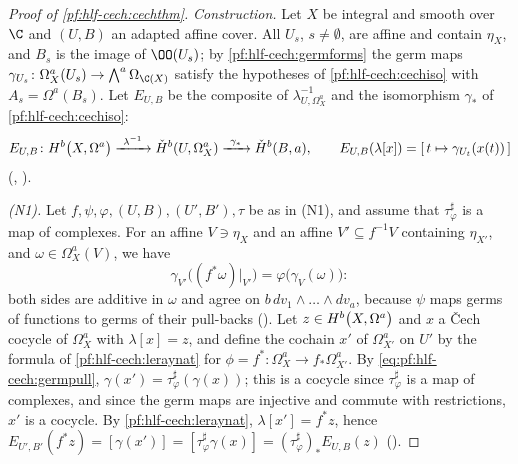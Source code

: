 \begin{proof}[Proof of \cref{pf:hlf-cech:cechthm}]
\emph{Construction.} Let $X$ be integral and smooth over $\C$ and $(U,B)$ an adapted affine cover. All $U_s$, $s\ne\emptyset$, are affine and
contain $\eta_X$, and $B_s$ is the image of $\OO(U_s)$; by \cref{pf:hlf-cech:germforms} the germ maps $\gamma_{U_s}\colon\Omega^a_X(U_s)\to
\bigwedge^a\Omega_{\C(X)}$ satisfy the hypotheses of \cref{pf:hlf-cech:cechiso} with $A_s=\Omega^a(B_s)$. Let $E_{U,B}$ be the composite of
$\lambda_{U,\Omega^a_X}^{-1}$ and the isomorphism $\gamma_*$ of \cref{pf:hlf-cech:cechiso}:
\[
  E_{U,B}\colon\hlfcechHdg{X}{a}{b}\xrightarrow{\ \lambda^{-1}\ }\check H^b(U,\Omega^a_X)\xrightarrow{\ \gamma_*\ }\check H^b(B,a),\qquad
  E_{U,B}(\lambda[x])=[\,t\mapsto\gamma_{U_t}(x(t))\,]
\]
(, ).

\emph{(N1).} Let $f,\psi,\varphi,(U,B),(U',B'),\tau$ be as in (N1), and assume that $\tau^\sharp_\varphi$ is a map of complexes. For an affine
$V\ni\eta_X$ and an affine $V'\subseteq f^{-1}V$ containing $\eta_{X'}$, and $\omega\in\Omega^a_X(V)$, we have
\begin{equation}\label{eq:pf:hlf-cech:germpull}
  \gamma_{V'}\bigl((f^*\omega)|_{V'}\bigr)=\varphi\bigl(\gamma_V(\omega)\bigr):
\end{equation}
both sides are additive in $\omega$ and agree on $b\,dv_1\wedge\dots\wedge dv_a$, because $\psi$ maps germs of functions to germs of their
pull-backs (). Let $z\in\hlfcechHdg{X}{a}{b}$ and $x$ a \v{C}ech cocycle of
$\Omega^a_X$ with $\lambda[x]=z$, and define the cochain $x'$ of $\Omega^a_{X'}$ on $U'$ by the formula of \cref{pf:hlf-cech:leraynat} for
$\phi=f^*\colon\Omega^a_X\to f_*\Omega^a_{X'}$. By \eqref{eq:pf:hlf-cech:germpull}, $\gamma(x')=\tau^\sharp_\varphi(\gamma(x))$; this is a cocycle since
$\tau^\sharp_\varphi$ is a map of complexes, and since the germ maps are injective and commute with restrictions, $x'$ is a cocycle. By
\cref{pf:hlf-cech:leraynat}, $\lambda[x']=f^*z$, hence
$E_{U',B'}(f^*z)=[\gamma(x')]=[\tau^\sharp_\varphi\gamma(x)]=(\tau^\sharp_\varphi)_*E_{U,B}(z)$ ().


\end{proof}
